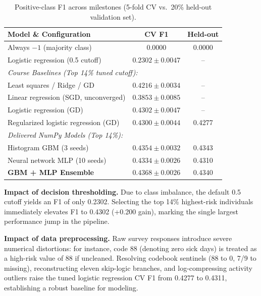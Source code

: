\documentclass[10pt,conference,compsocconf]{IEEEtran}
\begin{document}
\begin{table}[tbp]
  \centering
  \footnotesize
  \caption{Positive-class F1 across milestones (5-fold CV vs.\ 20\% held-out validation set).}
  \label{tab:results}
  \setlength{\tabcolsep}{2.0pt}
  \begin{tabular}{lcc}
    \toprule
    Model \& Configuration & CV F1 & Held-out \\
    \midrule
    Always $-1$ (majority class) & 0.0000 & 0.0000 \\
    Logistic regression (0.5 cutoff) & $0.2302 \pm 0.0047$ & -- \\
    \midrule
    \multicolumn{3}{l}{\textit{Course Baselines (Top 14\% tuned cutoff):}} \\
    Least squares / Ridge / GD & $0.4216 \pm 0.0034$ & -- \\
    Linear regression (SGD, unconverged) & $0.3853 \pm 0.0085$ & -- \\
    Logistic regression (GD) & $0.4302 \pm 0.0047$ & -- \\
    Regularized logistic regression (GD) & $0.4300 \pm 0.0044$ & 0.4277 \\
    \midrule
    \multicolumn{3}{l}{\textit{Delivered NumPy Models (Top 14\%):}} \\
    Histogram GBM (3 seeds) & $0.4354 \pm 0.0032$ & 0.4343 \\
    Neural network MLP (10 seeds) & $0.4334 \pm 0.0026$ & 0.4310 \\
    \midrule
    \textbf{GBM + MLP Ensemble} & $\mathbf{0.4368 \pm 0.0026}$ & $\mathbf{0.4340}$ \\
    \bottomrule
  \end{tabular}
  \vspace{-3mm}
\end{table}

\textbf{Impact of decision thresholding.} Due to class imbalance, the default 0.5 cutoff yields an F1 of only 0.2302. Selecting the top 14\% highest-risk individuals immediately elevates F1 to 0.4302 (+0.200 gain), marking the single largest performance jump in the pipeline.

\textbf{Impact of data preprocessing.} Raw survey responses introduce severe numerical distortions: for instance, code 88 (denoting zero sick days) is treated as a high-risk value of 88 if uncleaned. Resolving codebook sentinels (88 to 0, 7/9 to missing), reconstructing eleven skip-logic branches, and log-compressing activity outliers raise the tuned logistic regression CV F1 from 0.4277 to 0.4311, establishing a robust baseline for modeling.
\end{document}
